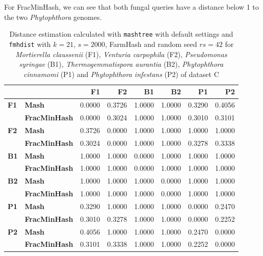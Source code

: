 For FracMinHash, we can see that both fungal queries have a distance below 1 to
the two \textit{Phytophthora} genomes.


\begin{table}[]
  \centering
  \begin{tabular}{@{}llrrrrrr@{}}
  \toprule
              &                      & \textbf{F1} & \textbf{F2} & \textbf{B1} & \textbf{B2} & \textbf{P1} & \textbf{P2} \\ \midrule
  \textbf{F1} & \textbf{Mash}        & 0.0000      & 0.3726      & 1.0000      & 1.0000      & 0.3290      & 0.4056      \\
  \textbf{}   & \textbf{FracMinHash} & 0.0000      & 0.3024      & 1.0000      & 1.0000      & 0.3010      & 0.3101      \\ \midrule
  \textbf{F2} & \textbf{Mash}        & 0.3726      & 0.0000      & 1.0000      & 1.0000      & 1.0000      & 1.0000      \\
  \textbf{}   & \textbf{FracMinHash} & 0.3024      & 0.0000      & 1.0000      & 1.0000      & 0.3278      & 0.3338      \\ \midrule
  \textbf{B1} & \textbf{Mash}        & 1.0000      & 1.0000      & 0.0000      & 1.0000      & 1.0000      & 1.0000      \\
  \textbf{}   & \textbf{FracMinHash} & 1.0000      & 1.0000      & 0.0000      & 1.0000      & 1.0000      & 1.0000      \\ \midrule
  \textbf{B2} & \textbf{Mash}        & 1.0000      & 1.0000      & 1.0000      & 0.0000      & 1.0000      & 1.0000      \\
  \textbf{}   & \textbf{FracMinHash} & 1.0000      & 1.0000      & 1.0000      & 0.0000      & 1.0000      & 1.0000      \\ \midrule
  \textbf{P1} & \textbf{Mash}        & 0.3290      & 1.0000      & 1.0000      & 1.0000      & 0.0000      & 0.2470      \\
  \textbf{}   & \textbf{FracMinHash} & 0.3010      & 0.3278      & 1.0000      & 1.0000      & 0.0000      & 0.2252      \\ \midrule
  \textbf{P2} & \textbf{Mash}        & 0.4056      & 1.0000      & 1.0000      & 1.0000      & 0.2470      & 0.0000      \\
  \textbf{}   & \textbf{FracMinHash} & 0.3101      & 0.3338      & 1.0000      & 1.0000      & 0.2252      & 0.0000      \\ \bottomrule
  \end{tabular}
  \caption{Distance estimation calculated with \texttt{mashtree} with default
  settings and \texttt{fmhdist} with $k=21$, $s=2000$, FarmHash and random seed
  $rs=42$ for \textit{Mortierella claussenii} (F1), \textit{Venturia carpophila}
  (F2), \textit{Pseudomonas syringae} (B1), \textit{Thermogemmatispora aurantia}
  (B2), \textit{Phytophthora cinnamomi} (P1) and \textit{Phytophthora infestans}
  (P2) of dataset C}
  \label{ta:avocadoDistance}
\end{table}

